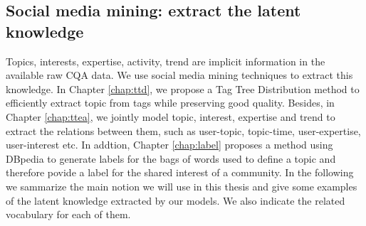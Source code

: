 

\subsection{Social media mining: extract the latent knowledge}

Topics, interests, expertise, activity, trend are implicit information in the available raw CQA data. We use social media mining techniques to extract this knowledge.
In Chapter \ref{chap:ttd}, we propose a Tag Tree Distribution method to efficiently extract topic from tags while preserving good quality. Besides, in Chapter \ref{chap:ttea}, we jointly model topic, interest, expertise and trend to extract the relations between them, such as user-topic, topic-time, user-expertise, user-interest etc. In addtion, Chapter \ref{chap:label} proposes a method using DBpedia to generate labels for the bags of words  used to define a topic and therefore povide a label for the shared interest of a community. 
In the following we sammarize the main notion we will use in this thesis and give some examples of the latent knowledge extracted by our models. We also indicate the related vocabulary for each of them.

